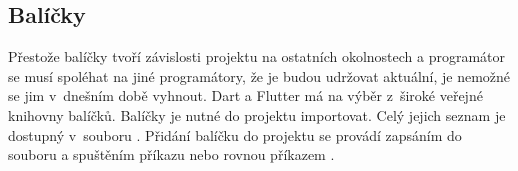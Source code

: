 \documentclass[
  biblatex,
  figures=true,
  tables=false,
  glossaries,
  index
]{kidiplom}
\begin{document}
\subsection{Balíčky}

Přestože balíčky tvoří závislosti projektu na ostatních okolnostech a programátor se musí spoléhat na jiné programátory, že je budou udržovat aktuální, je nemožné se jim v~dnešním době vyhnout. Dart a Flutter má na výběr z~široké veřejné knihovny balíčků. Balíčky je nutné do projektu importovat. Celý jejich seznam je dostupný v~souboru . Přidání balíčku do projektu se provádí zapsáním do souboru  a spuštěním příkazu  nebo rovnou příkazem \kiinlinecode{}{;}{}.
\end{document}
